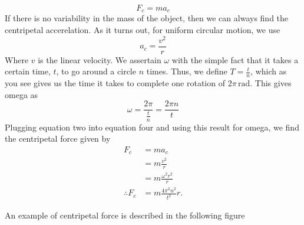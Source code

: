 \documentclass{report}
\begin{document}
    \begin{equation}
        F_c = m a_c
    \end{equation}
    \bigbreak \noindent 
    If there is no variability in the mass of the object, then we can always find the centripetal accerelation. As it turns out, for uniform circular motion, we use
    \begin{equation}
       a_{c} = \frac{v^{2}}{r} 
    \end{equation}
    \bigbreak \noindent 
    Where $v$ is the linear velocity. We assertain $\omega$ with the simple fact that it takes a certain time, $t$, to go around a circle $n$ times. Thus, we define $T = \frac{t}{n}$, which as you see gives us the time it takes to complete one rotation of $2\pi \, \text{rad}$. This gives omega as
    \begin{equation}
        \omega = \frac{2\pi}{\frac{t}{n}} = \frac{2\pi n}{t}
    \end{equation}
    \bigbreak \noindent 
    Plugging equation two into equation four and using this result for omega, we find the centripetal force given by
    \begin{align*}
        F_{c} &= ma_{c} \\
        &=m \frac{v^{2}}{r} \\
        &=m \frac{\omega^{2}r^{2}}{r} \\
        \therefore F_{c} &=m \frac{4\pi^{2}n^{2}}{t^{2}}r
    .\end{align*}

    \bigbreak \noindent 
    An example of centripetal force is described in the following figure
    \bigbreak \noindent 
    \begin{figure}[ht]
        \centering
        \label{fig:fig2}
    \end{figure}
    \bigbreak \noindent 

    \bigbreak \noindent 
\end{document}
